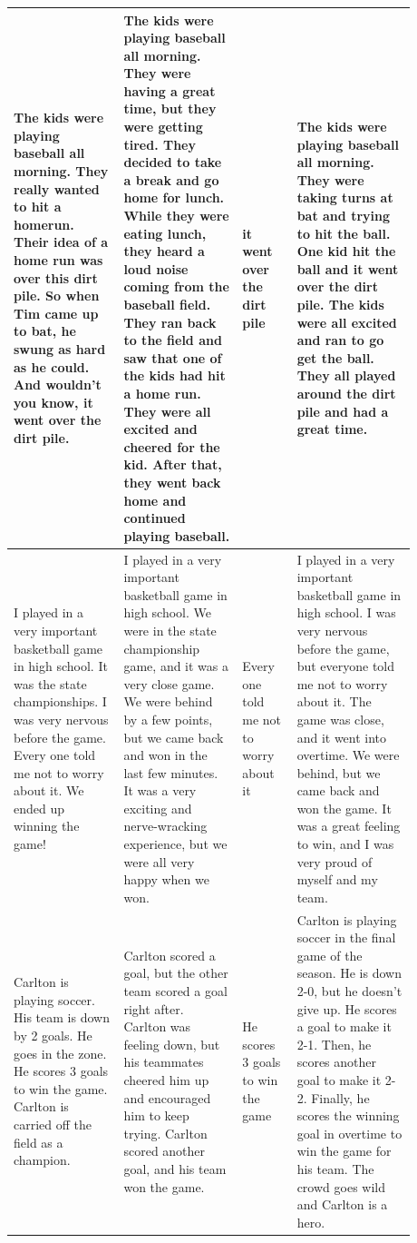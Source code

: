 \begin{table}[htp!]
\begin{tabular}{|p{0.24\linewidth}|p{0.26\linewidth}|p{0.12\linewidth}|p{0.26\linewidth}|}
The kids were playing baseball all morning. They really wanted to hit a homerun. Their idea of a home run was over this dirt pile. So when Tim came up to bat, he swung as hard as he could. And wouldn't you know, it went over the dirt pile.
& The kids were playing baseball all morning. They were having a great time, but they were getting tired. They decided to take a break and go home for lunch. While they were eating lunch, they heard a loud noise coming from the baseball field. They ran back to the field and saw that one of the kids had hit a home run. They were all excited and cheered for the kid. After that, they went back home and continued playing baseball.
& it went over the dirt pile
& The kids were playing baseball all morning. They were taking turns at bat and trying to hit the ball. One kid hit the ball and it went over the dirt pile. The kids were all excited and ran to go get the ball. They all played around the dirt pile and had a great time. \\ \hline

I played in a very important basketball game in high school. It was the state championships. I was very nervous before the game. Every one told me not to worry about it. We ended up winning the game!
& I played in a very important basketball game in high school. We were in the state championship game, and it was a very close game. We were behind by a few points, but we came back and won in the last few minutes. It was a very exciting and nerve-wracking experience, but we were all very happy when we won.
& Every one told me not to worry about it
& I played in a very important basketball game in high school. I was very nervous before the game, but everyone told me not to worry about it. The game was close, and it went into overtime. We were behind, but we came back and won the game. It was a great feeling to win, and I was very proud of myself and my team. \\ \hline

Carlton is playing soccer. His team is down by 2 goals. He goes in the zone. He scores 3 goals to win the game. Carlton is carried off the field as a champion.
& Carlton scored a goal, but the other team scored a goal right after. Carlton was feeling down, but his teammates cheered him up and encouraged him to keep trying. Carlton scored another goal, and his team won the game.
& He scores 3 goals to win the game
& Carlton is playing soccer in the final game of the season. He is down 2-0, but he doesn't give up. He scores a goal to make it 2-1. Then, he scores another goal to make it 2-2. Finally, he scores the winning goal in overtime to win the game for his team. The crowd goes wild and Carlton is a hero. \\ \hline


\end{tabular}
\end{table}
